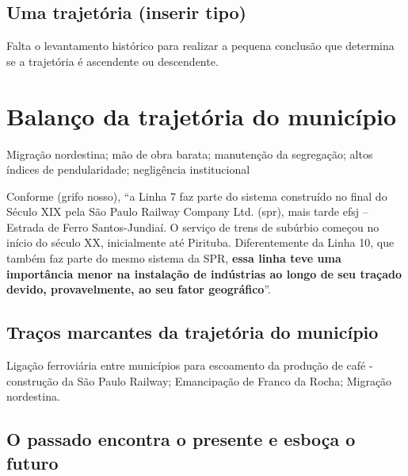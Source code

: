 	\section{Uma trajetória (inserir tipo)}
	
	Falta o levantamento histórico para realizar a pequena conclusão que determina se a trajetória é ascendente ou descendente.
	
	\chapter{Balanço da trajetória do município}
	
	Migração nordestina; mão de obra barata; manutenção da segregação; altos índices de pendularidade; negligência institucional
	
	Conforme \cite[p.64]{cptm2010a} (grifo nosso), ``a Linha 7 faz parte do sistema construído no final do Século XIX pela São Paulo Railway Company Ltd. (\gls{spr}), mais tarde \gls{efsj} – Estrada de Ferro Santos-Jundiaí. O serviço de trens de subúrbio começou no	início do século XX, inicialmente até Pirituba. Diferentemente da Linha 10, que também faz parte do mesmo sistema da SPR, \textbf{essa linha teve uma importância menor na instalação	de indústrias ao longo de seu traçado devido, provavelmente, ao seu fator geográfico}''.
	
	\section{Traços marcantes da trajetória do município}
		
	Ligação ferroviária entre municípios para escoamento da produção de café - construção da São Paulo Railway; Emancipação de Franco da Rocha; Migração nordestina.
	
	\section{O passado encontra o presente e esboça o futuro}
	

